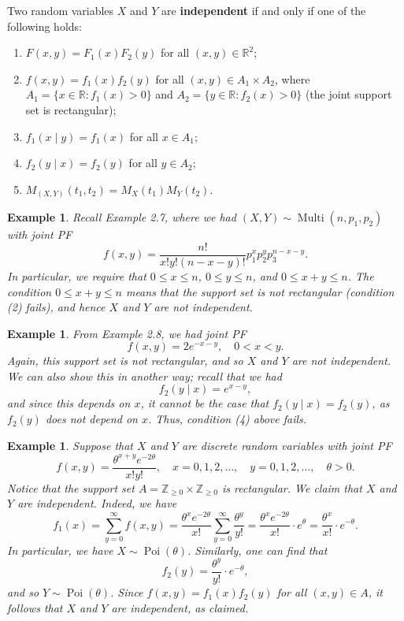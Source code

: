 \documentclass[10pt]{article}
\newcommand{\R}{\mathbb{R}}
\newcommand{\Z}{\mathbb{Z}}
\DeclareMathOperator{\Multi}{Multi}
\DeclareMathOperator{\Poi}{Poi}
\theoremstyle{newstyle}
\newtheorem{exmp}[thm]{Example}
\begin{document}
Two random variables $X$ and $Y$ are {\bf independent} if and only if one of the following holds: 
\begin{enumerate}[(1)]
    \item $F(x, y) = F_1(x) F_2(y)$ for all $(x, y) \in \R^2$; 
    \item $f(x, y) = f_1(x) f_2(y)$ for all $(x, y) \in A_1 \times A_2$, where 
    $A_1 = \{x \in \R : f_1(x) > 0\}$ and $A_2 = \{y \in \R : f_2(x) > 0\}$ 
    (the joint support set is rectangular); 
    \item $f_1(x \mid y) = f_1(x)$ for all $x \in A_1$;
    \item $f_2(y \mid x) = f_2(y)$ for all $y \in A_2$;
    \item $M_{(X,Y)}(t_1, t_2) = M_X(t_1) M_Y(t_2)$.
\end{enumerate}

\begin{exmp}
Recall Example 2.7, where we had $(X, Y) \sim \Multi(n, p_1, p_2)$ with joint PF 
\[ f(x, y) = \frac{n!}{x!y!(n-x-y)!} p_1^x p_2^y p_3^{n-x-y}. \]
In particular, we require that $0 \leq x \leq n$, $0 \leq y \leq n$, 
and $0 \leq x+y \leq n$. The condition $0 \leq x+y \leq n$ means that the support set 
is not rectangular (condition (2) fails), and hence $X$ and $Y$ are not independent.
\end{exmp}

\begin{exmp}
From Example 2.8, we had joint PF 
\[ f(x, y) = 2e^{-x-y}, \quad 0 < x < y. \]
Again, this support set is not rectangular, and so $X$ and $Y$ are not independent. 
We can also show this in another way; recall that we had 
\[ f_2(y \mid x) = e^{x-y}, \]
and since this depends on $x$, it cannot be the case that $f_2(y \mid x) = f_2(y)$, 
as $f_2(y)$ does not depend on $x$. Thus, condition (4) above fails.
\end{exmp}

\begin{exmp}
Suppose that $X$ and $Y$ are discrete random variables with joint PF 
\[ f(x, y) = \frac{\theta^{x+y} e^{-2\theta}}{x!y!}, \quad x = 0, 1, 2, \dots, \quad 
y = 0, 1, 2, \dots, \quad \theta > 0. \]
Notice that the support set $A = \Z_{\geq0} \times \Z_{\geq0}$ is rectangular. 
We claim that $X$ and $Y$ are independent. Indeed, we have 
\[ f_1(x) = \sum_{y=0}^\infty f(x, y) = \frac{\theta^x e^{-2\theta}}{x!} \sum_{y=0}^\infty \frac{\theta^y}{y!} = \frac{\theta^x e^{-2\theta}}{x!} \cdot e^\theta = 
\frac{\theta^x}{x!} \cdot e^{-\theta}. \]
In particular, we have $X \sim \Poi(\theta)$. Similarly, one can find that 
\[ f_2(y) = \frac{\theta^y}{y!} \cdot e^{-\theta}, \]
and so $Y \sim \Poi(\theta)$. Since $f(x, y) = f_1(x) f_2(y)$ for all $(x, y) \in A$, 
it follows that $X$ and $Y$ are independent, as claimed.
\end{exmp}
\end{document}
